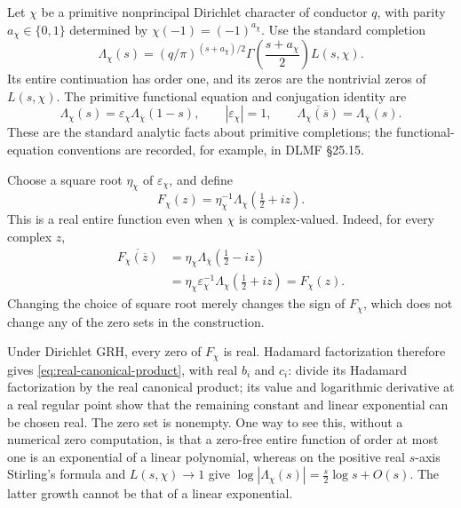 Let $\chi$ be a primitive nonprincipal Dirichlet character of conductor
$q$, with parity $a_\chi\in\{0,1\}$ determined by
$\chi(-1)=(-1)^{a_\chi}$.  Use the standard completion
\begin{equation}\label{eq:completed-dirichlet}
 \Lambda_\chi(s)=
  (q/\pi)^{(s+a_\chi)/2}
  \Gamma\!\left(\frac{s+a_\chi}{2}\right)L(s,\chi).
\end{equation}
Its entire continuation has order one, and its zeros are the
nontrivial zeros of $L(s,\chi)$.  The primitive functional equation and
conjugation identity are
\begin{equation}\label{eq:completed-functional-equation}
 \Lambda_\chi(s)=\varepsilon_\chi
                  \Lambda_{\overline\chi}(1-s),
 \qquad |\varepsilon_\chi|=1,\qquad
 \overline{\Lambda_\chi(\overline s)}
                  =\Lambda_{\overline\chi}(s).
\end{equation}
These are the standard analytic facts about primitive completions;
the functional-equation conventions are recorded, for example, in
DLMF \S25.15.\cite{dlmfdirichlet}

Choose a square root $\eta_\chi$ of $\varepsilon_\chi$, and define
\begin{equation}\label{eq:phase-real-dirichlet}
 F_\chi(z)=\eta_\chi^{-1}
             \Lambda_\chi\!\left(\tfrac12+iz\right).
\end{equation}
This is a real entire function even when $\chi$ is complex-valued.
Indeed, for every complex $z$,
\begin{align*}
 \overline{F_\chi(\overline z)}
 &=\eta_\chi
       \Lambda_{\overline\chi}\!\left(\tfrac12-iz\right)\\
 &=\eta_\chi\varepsilon_\chi^{-1}
       \Lambda_\chi\!\left(\tfrac12+iz\right)
 =F_\chi(z).
\end{align*}
Changing the choice of square root merely changes the sign of $F_\chi$,
which does not change any of the zero sets in the construction.

Under Dirichlet GRH, every zero of $F_\chi$ is real.
Hadamard factorization therefore gives
\eqref{eq:real-canonical-product}, with real $b_i$ and $c_i$:
divide its Hadamard factorization by the real canonical product; its
value and logarithmic derivative at a real regular point show that
the remaining constant and linear exponential can be chosen real.
The zero set is nonempty.  One way to see this, without a numerical
zero computation, is that a zero-free entire function of order at most
one is an exponential of a linear polynomial, whereas on the positive
real $s$-axis Stirling's formula and $L(s,\chi)\to1$ give
$\log|\Lambda_\chi(s)|=\tfrac{s}{2}\log s+O(s)$.
The latter growth cannot be that of a linear exponential.

